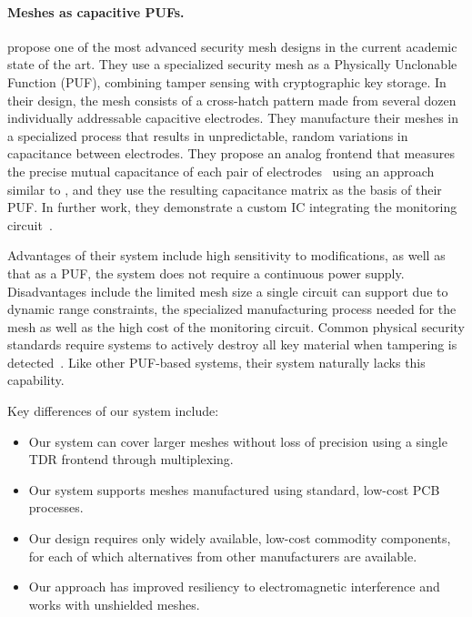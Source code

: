 \documentclass[final]{iacrtrans}
\begin{document}
\paragraph{Meshes as capacitive PUFs.}
\textcite{
    immlerBTREPIDBatterylessTamperresistant2018,
    obermaierMeasurementSystemCapacitive2018,
    garbTamperSensitiveDesignPUFBased}
propose one of the most advanced security mesh designs in the current academic state of the art. They use a specialized
security mesh as a Physically Unclonable Function (PUF), combining tamper sensing with cryptographic key storage. In
their design, the mesh consists of a cross-hatch pattern made from several dozen individually addressable capacitive
electrodes. They manufacture their meshes in a specialized process that results in unpredictable, random variations in
capacitance between electrodes. They propose an analog frontend that measures the precise mutual capacitance of each
pair of electrodes~\cite{obermaierMeasurementSystemCapacitive2018} using an approach similar to
\textcite{satoToucheEnhancingTouch2012}, and they use the resulting capacitance matrix as the basis of their PUF. In
further work, they demonstrate a custom IC integrating the monitoring
circuit~\cite{garbFORTRESSFORtifiedTamperResistant2021}.

Advantages of their system include high sensitivity to modifications, as well as that as a PUF, the system does not
require a continuous power supply. Disadvantages include the limited mesh size a single circuit can support due to
dynamic range constraints, the specialized manufacturing process needed for the mesh as well as the high cost of the
monitoring circuit. Common physical security standards require systems to actively destroy all key material when
tampering is detected~\cite{
    usnationalinstituteofstandardsandtechnologySecurityRequirementsCryptographic2002,
    ISOIEC24759,
    pcisecuritystandardscouncilPaymentCardIndustry2021}.
Like other PUF-based systems, their system naturally lacks this capability.

Key differences of our system include:
\begin{itemize}
    \item Our system can cover larger meshes without loss of precision using a single TDR frontend through multiplexing.

    \item Our system supports meshes manufactured using standard, low-cost PCB processes.

    \item Our design requires only widely available, low-cost commodity components, for each of which alternatives
        from other manufacturers are available.

    \item Our approach has improved resiliency to electromagnetic interference and works with unshielded meshes.
\end{itemize}
\end{document}
